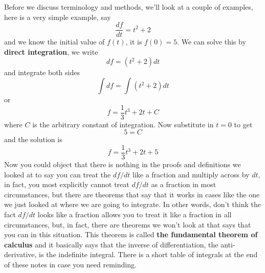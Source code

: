 \documentclass[12pt]{article}
\begin{document}
Before we discuss terminology and methods, we'll look at a couple of examples, here is a very simple example, say
\begin{equation}
  \frac{df}{dt}=t^2+2
\end{equation}
and we know the initial value of $f(t)$, it is $f(0)=5$. We can solve this by \textbf{direct integration}, we write
\begin{equation}
  df=(t^2+2)dt
\end{equation}
and integrate both sides
\begin{equation}
  \int df = \int (t^2+2)dt
\end{equation}
or
\begin{equation}
  f=\frac{1}{3}t^3+2t+C
\end{equation}
where $C$ is the arbitrary constant of integration. Now substitute in $t=0$ to get
\begin{equation}
  5=C
\end{equation}
and the solution is
\begin{equation}
  f=\frac{1}{3}t^3+2t+5
\end{equation}
Now you could object that there is nothing in the proofs and
definitions we looked at to say you can treat the $df/dt$ like a
fraction and multiply across by $dt$, in fact, you most explicitly
cannot treat $df/dt$ as a fraction in most circumstances, but there
are theorems that say that it works in cases like the one we just
looked at where we are going to integrate. In other words, don't think
the fact $df/dt$ looks like a fraction allows you to treat it like a
fraction in all circumstances, but, in fact, there are theorems we
won't look at that says that you can in this situation. This theorem
is called \textbf{the fundamental theorem of calculus} and it
basically says that the inverse of differentiation, the
anti-derivative, is the indefinite integral. There is a short table of
integrals at the end of these notes in case you need reminding.
\end{document}
